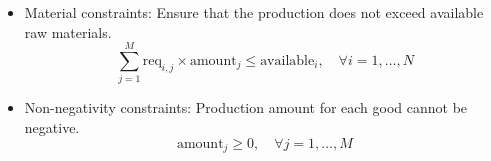\documentclass{article}
\begin{document}
\begin{itemize}
    \item Material constraints: Ensure that the production does not exceed available raw materials.
    \[
    \sum_{j=1}^{M} \text{req}_{i,j} \times \text{amount}_j \leq \text{available}_i, \quad \forall i = 1, \ldots, N
    \]
    \item Non-negativity constraints: Production amount for each good cannot be negative.
    \[
    \text{amount}_j \geq 0, \quad \forall j = 1, \ldots, M
    \]
\end{itemize}
\end{document}
